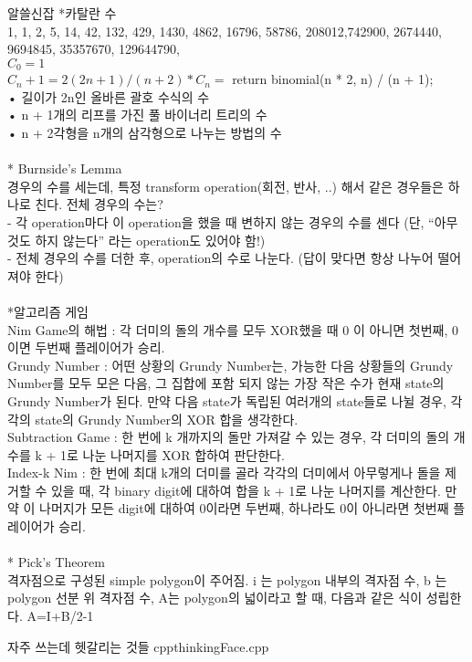 \documentclass[landscape, 10pt, a4paper, oneside, twocolumn]{extarticle}
\begin{document}
\Algorithm
{알쓸신잡}
{
*카탈란 수\\
1, 1, 2, 5, 14, 42, 132, 429, 1430, 4862, 16796, 58786, 208012,742900, 2674440, 9694845, 35357670, 129644790,\\
${C_0 = 1}$\\
${C_n+1 = {2(2n+1)/(n+2)}*C_n =}$ return binomial(n * 2, n) / (n + 1);\\
• 길이가 2n인 올바른 괄호 수식의 수\\
• n + 1개의 리프를 가진 풀 바이너리 트리의 수\\
• n + 2각형을 n개의 삼각형으로 나누는 방법의 수\\
\\
* Burnside’s Lemma\\
경우의 수를 세는데, 특정 transform operation(회전, 반사, ..) 해서 같은 경우들은 하나로 친다. 전체 경우의 수는?\\
- 각 operation마다 이 operation을 했을 때 변하지 않는 경우의 수를 센다 (단, “아무것도 하지 않는다” 라는 operation도 있어야 함!)\\
- 전체 경우의 수를 더한 후, operation의 수로 나눈다. (답이 맞다면 항상 나누어 떨어져야 한다)\\
\\
*알고리즘 게임\\
Nim Game의 해법 : 각 더미의 돌의 개수를 모두 XOR했을 때 0 이 아니면 첫번째, 0 이면 두번째 플레이어가 승리.\\
Grundy Number : 어떤 상황의 Grundy Number는, 가능한 다음 상황들의 Grundy Number를 모두 모은 다음, 그 집합에 포함 되지 않는 가장 작은 수가 현재 state의 Grundy Number가 된다. 만약 다음 state가 독립된 여러개의 state들로 나뉠 경우, 각각의 state의 Grundy Number의 XOR 합을 생각한다.\\
Subtraction Game : 한 번에 k 개까지의 돌만 가져갈 수 있는 경우, 각 더미의 돌의 개수를 k + 1로 나눈 나머지를 XOR 합하여 판단한다.\\
Index-k Nim : 한 번에 최대 k개의 더미를 골라 각각의 더미에서 아무렇게나 돌을 제거할 수 있을 때, 각 binary digit에 대하여 합을 k + 1로 나눈 나머지를 계산한다. 만약 이 나머지가 모든 digit에 대하여 0이라면 두번째, 하나라도 0이 아니라면 첫번째 플레이어가 승리.\\
\\
* Pick’s Theorem\\
격자점으로 구성된 simple polygon이 주어짐. i 는 polygon 내부의 격자점 수, b 는 polygon 선분 위 격자점 수, A는 polygon의 넓이라고 할 때, 다음과 같은 식이 성립한다. A=I+B/2-1
}
{}
{}{}

\Algorithm
{자주 쓰는데 헷갈리는 것들}
{}
{}
{cpp}{thinkingFace.cpp}
\end{document}
